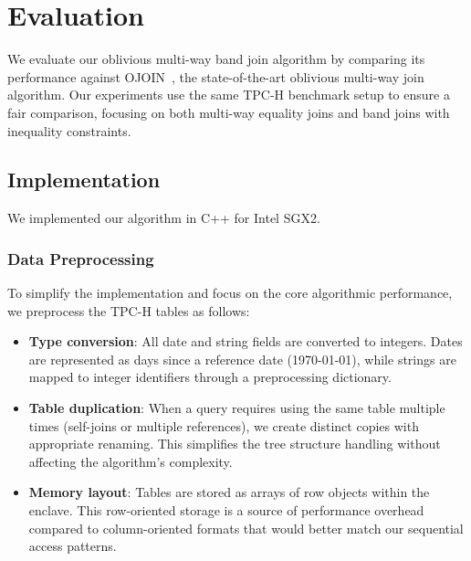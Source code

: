 \chapter{Evaluation}

We evaluate our oblivious multi-way band join algorithm by comparing its performance against OJOIN~\cite{hu2025optimal}, the state-of-the-art oblivious multi-way join algorithm. Our experiments use the same TPC-H benchmark setup to ensure a fair comparison, focusing on both multi-way equality joins and band joins with inequality constraints.

\section{Implementation}

We implemented our algorithm in C++ for Intel SGX2.

\subsection{Data Preprocessing}

To simplify the implementation and focus on the core algorithmic performance, we preprocess the TPC-H tables as follows:

\begin{itemize}
\item \textbf{Type conversion}: All date and string fields are converted to integers. Dates are represented as days since a reference date (1970-01-01), while strings are mapped to integer identifiers through a preprocessing dictionary.

\item \textbf{Table duplication}: When a query requires using the same table multiple times (self-joins or multiple references), we create distinct copies with appropriate renaming. This simplifies the tree structure handling without affecting the algorithm's complexity.

\item \textbf{Memory layout}: Tables are stored as arrays of row objects within the enclave. This row-oriented storage is a source of performance overhead compared to column-oriented formats that would better match our sequential access patterns.
\end{itemize}


